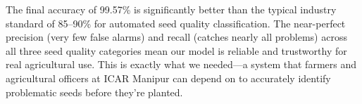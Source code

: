 The final accuracy of 99.57\% is significantly better than the typical industry standard of 85--90\% for automated seed quality classification. The near-perfect precision (very few false alarms) and recall (catches nearly all problems) across all three seed quality categories mean our model is reliable and trustworthy for real agricultural use. This is exactly what we needed—a system that farmers and agricultural officers at ICAR Manipur can depend on to accurately identify problematic seeds before they're planted.